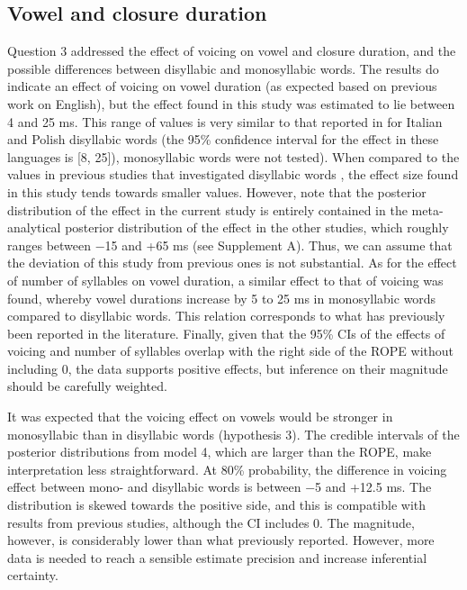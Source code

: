 \documentclass[12pt,a4paper,]{article}
\begin{document}
\hypertarget{vowel-and-closure-duration}{%
\subsection{Vowel and closure
duration}\label{vowel-and-closure-duration}}

\label{s:vc-disc}

Question 3 addressed the effect of voicing on vowel and closure
duration, and the possible differences between disyllabic and
monosyllabic words. The results do indicate an effect of voicing on
vowel duration (as expected based on previous work on English), but the
effect found in this study was estimated to lie between 4 and 25 ms.
This range of values is very similar to that reported in
\citet{coretta2019k} for Italian and Polish disyllabic words (the 95\%
confidence interval for the effect in these languages is {[}8, 25{]}),
monosyllabic words were not tested). When compared to the values in
previous studies that investigated disyllabic words
\citep{sharf1962, klatt1973, davis1989}, the effect size found in this
study tends towards smaller values. However, note that the posterior
distribution of the effect in the current study is entirely contained in
the meta-analytical posterior distribution of the effect in the other
studies, which roughly ranges between −15 and +65 ms (see Supplement A).
Thus, we can assume that the deviation of this study from previous ones
is not substantial. As for the effect of number of syllables on vowel
duration, a similar effect to that of voicing was found, whereby vowel
durations increase by 5 to 25 ms in monosyllabic words compared to
disyllabic words. This relation corresponds to what has previously been
reported in the literature. Finally, given that the 95\% CIs of the
effects of voicing and number of syllables overlap with the right side
of the ROPE without including 0, the data supports positive effects, but
inference on their magnitude should be carefully weighted.

It was expected that the voicing effect on vowels would be stronger in
monosyllabic than in disyllabic words (hypothesis 3). The credible
intervals of the posterior distributions from model 4, which are larger
than the ROPE, make interpretation less straightforward. At 80\%
probability, the difference in voicing effect between mono- and
disyllabic words is between −5 and +12.5 ms. The distribution is skewed
towards the positive side, and this is compatible with results from
previous studies, although the CI includes 0. The magnitude, however, is
considerably lower than what previously reported. However, more data is
needed to reach a sensible estimate precision and increase inferential
certainty.
\end{document}
